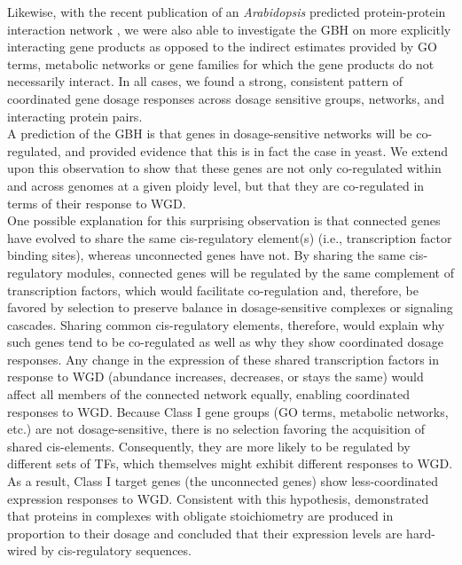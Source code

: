 \documentclass[11pt]{article}
\begin{document}
Likewise, with the recent publication of an \textit{Arabidopsis} predicted protein-protein interaction network \citep{dong2019}, we were also able to investigate the GBH on more explicitly interacting gene products as opposed to the indirect estimates provided by GO terms, metabolic networks or gene families for which the gene products do not necessarily interact.
In all cases, we found a strong, consistent pattern of coordinated gene dosage responses across dosage sensitive groups, networks, and interacting protein pairs.\\

A prediction of the GBH is that genes in dosage-sensitive networks will be co-regulated, and \cite{papp2003} provided evidence that this is in fact the case in yeast.
We extend upon this observation to show that these genes are not only co-regulated within and across genomes at a given ploidy level, but that they are co-regulated in terms of their response to WGD.\\

One possible explanation for this surprising observation is that connected genes have evolved to share the same cis-regulatory element(s) (i.e., transcription factor binding sites), whereas unconnected genes have not.
By sharing the same cis-regulatory modules, connected genes will be regulated by the same complement of transcription factors, which would facilitate co-regulation and, therefore, be favored by selection to preserve balance in dosage-sensitive complexes or signaling cascades.
Sharing common cis-regulatory elements, therefore, would explain why such genes tend to be co-regulated as well as why they show coordinated dosage responses.
Any change in the expression of these shared transcription factors in response to WGD (abundance increases, decreases, or stays the same) would affect all members of the connected network equally, enabling coordinated responses to WGD. Because Class I gene groups (GO terms, metabolic networks, etc.) are not dosage-sensitive, there is no selection favoring the acquisition of shared cis-elements.
Consequently, they are more likely to be regulated by different sets of TFs, which themselves might exhibit different responses to WGD.
As a result, Class I target genes (the unconnected genes) show less-coordinated expression responses to WGD.
Consistent with this hypothesis, \cite{taggart2018}  demonstrated that proteins in complexes with obligate stoichiometry are produced in proportion to their dosage and concluded that their expression levels are hard-wired by cis-regulatory sequences.\\
\end{document}
